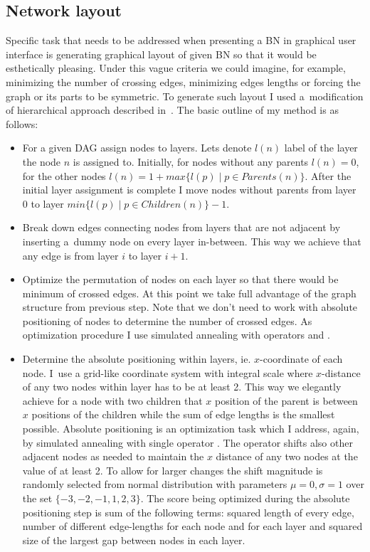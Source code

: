 \documentclass[english,cover]{fitthesis} %
\begin{document}
\subsection{Network layout}
Specific task that needs to be addressed when presenting a BN in graphical user interface is generating graphical layout of given BN so that it would be esthetically pleasing. Under this vague criteria we could imagine, for example, minimizing the number of crossing edges, minimizing edges lengths or forcing the graph or its parts to be symmetric. To generate such layout I used a~modification of hierarchical approach described in~\cite[p.~22]{graph_drawing}. The basic outline of my method is as follows:
\begin{itemize}
	\item For a given DAG assign nodes to layers. Lets denote $l(n)$ label of the layer the node $n$ is assigned to. Initially, for nodes without any parents $l(n)=0$, for the other nodes $l(n) = 1 + max \lbrace l(p) \mid p \in Parents(n)\rbrace$. After the initial layer assignment is complete I move nodes without parents from layer 0 to layer $min \lbrace l(p) \mid p \in Children(n)\rbrace - 1$.
	\item Break down edges connecting nodes from layers that are not adjacent by inserting a~dummy node on every layer in-between. This way we achieve that any edge is from layer $i$ to layer $i+1$.
	\item Optimize the permutation of nodes on each layer so that there would be minimum of crossed edges. At this point we take full advantage of the graph structure from previous step. Note that we don't need to work with absolute positioning of nodes to determine the number of crossed edges. As optimization procedure I use simulated annealing with operators  and .
    \item Determine the absolute positioning within layers, ie. $x$-coordinate of each node. I~use a grid-like coordinate system with integral scale where $x$-distance of any two nodes within layer has to be at least 2. This way we elegantly achieve for a node with two children that $x$ position of the parent is between $x$ positions of the children while the sum of edge lengths is the smallest possible. Absolute positioning is an optimization task which I address, again, by simulated annealing with single operator . The operator shifts also other adjacent nodes as needed to maintain the $x$ distance of any two nodes at the value of at least 2. To allow for larger changes the shift magnitude is randomly selected from normal distribution with parameters $\mu=0, \sigma = 1$ over the set $\lbrace -3, -2, -1, 1, 2, 3\rbrace$. The score being optimized during the absolute positioning step is sum of the following terms: squared length of every edge, number of different edge-lengths for each node and for each layer and squared size of the largest gap between nodes in each layer.
\end{itemize}
\end{document}
